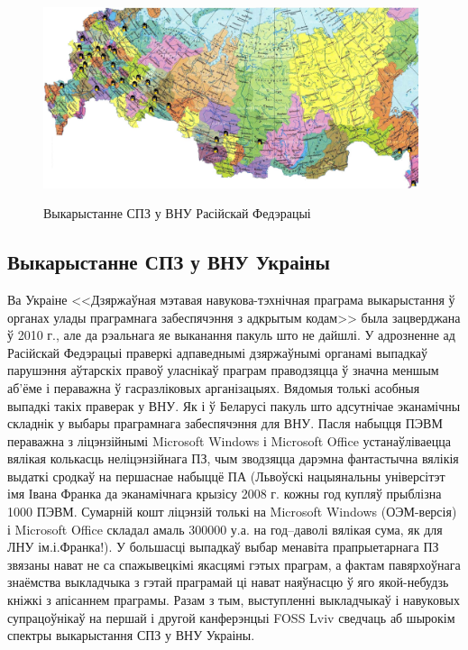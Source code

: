 \documentclass[10pt, a5paper]{article}
\begin{document}
\begin{figure}[htpb]
  \centering
  \includegraphics[width=11cm]{03_2012_russia2_with_tux}
  \label{fig:Zlobin2}
  \caption{Выкарыстанне СПЗ у ВНУ Расійскай Федэрацыі}
\end{figure}

\subsection*{Выкарыстанне СПЗ у ВНУ Украіны}

Ва Украіне <<Дзяржаўная мэтавая навукова-тэхнічная праграма выкарыстання ў
органах улады праграмнага забеспячэння з адкрытым кодам>> была зацверджана
ў 2010 г., але да рэальнага яе выканання пакуль што не дайшлі. У адрозненне ад
Расійскай Федэрацыі праверкі адпаведнымі дзяржаўнымі органамі выпадкаў
парушэння аўтарскіх правоў уласнікаў праграм праводзяцца ў значна меншым аб'ёме
і пераважна ў гасразліковых арганізацыях. Вядомыя толькі асобныя выпадкі такіх
праверак у ВНУ. Як і ў Беларусі пакуль што адсутнічае эканамічны складнік
у выбары праграмнага забеспячэння для ВНУ. Пасля набыцця ПЭВМ пераважна
з ліцэнзійнымі Microsoft Windows і Microsoft Office устанаўліваецца вялікая колькасць
неліцэнзійнага ПЗ, чым зводзяцца дарэмна фантастычна вялікія выдаткі сродкаў
на першаснае набыццё ПА (Львоўскі нацыянальны універсітэт імя Івана Франка
да эканамічнага крызісу 2008 г. кожны год купляў прыблізна 1000 ПЭВМ. Сумарній
кошт ліцэнзій толькі на Microsoft Windows (ОЭМ-версія) і Microsoft Office складал амаль 300000
у.а. на год--даволі вялікая сума, як для ЛНУ ім.і.Франка!). У большасці выпадкаў
выбар менавіта прапрыетарнага ПЗ звязаны нават не са спажывецкімі якасцямі
гэтых праграм, а фактам павярхоўнага знаёмства выкладчыка з гэтай праграмай
ці нават наяўнасцю ў яго якой-небудзь кніжкі з апісаннем праграмы. Разам з
тым, выступленні выкладчыкаў і навуковых супрацоўнікаў на першай і другой
канферэнцыі FOSS Lviv  \cite{Zlobin1, Zlobin2} сведчаць аб шырокім спектры выкарыстання СПЗ
у ВНУ Украіны.
\end{document}
